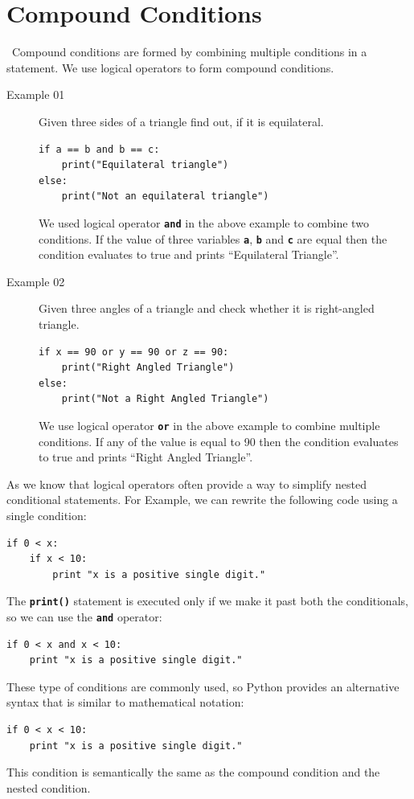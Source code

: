 \documentclass[11pt,a4paper]{article}
\newcommand{\Code}[1]{\textbf{\texttt{#1}}}
\begin{document}
\section*{Compound Conditions}\
Compound conditions are formed by combining multiple conditions in a statement. We use logical operators to form compound conditions.
\begin{description}
\item[Example 01] Given three sides of a triangle find out, if it is equilateral.
\begin{verbatim}
if a == b and b == c:
    print("Equilateral triangle")
else:
    print("Not an equilateral triangle")
\end{verbatim}
We used logical operator \Code{and} in the above example to combine two conditions.
If the value of three variables \Code{a}, \Code{b} and \Code{c} are equal then the condition evaluates to true and prints ``Equilateral Triangle''.

\item[Example 02] Given three angles of a triangle and check whether it is right-angled triangle.
\begin{verbatim}
if x == 90 or y == 90 or z == 90:
    print("Right Angled Triangle")
else:
    print("Not a Right Angled Triangle")
\end{verbatim}
We use logical operator \Code{or} in the above example to combine multiple conditions.
If any of the value is equal to 90 then the condition evaluates to true and prints ``Right Angled Triangle''.
\end{description}
As we know that logical operators often provide a way to simplify nested conditional statements. For Example, we can rewrite the following code using a single condition:
\begin{lstlisting}
if 0 < x:
    if x < 10:
        print "x is a positive single digit."
\end{lstlisting}
The \Code{print()} statement is executed only if we make it past both the conditionals, so we can use the \Code{and} operator:
\begin{lstlisting}
if 0 < x and x < 10:
    print "x is a positive single digit."
\end{lstlisting}
These type of conditions are commonly used, so Python provides an alternative syntax that is similar to mathematical notation:
\begin{lstlisting}
if 0 < x < 10:
    print "x is a positive single digit."
\end{lstlisting}
This condition is semantically the same as the compound condition and the nested condition.
\end{document}
